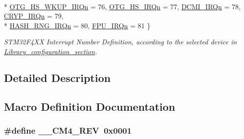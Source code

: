 \begin{DoxyCompactItemize}
\\*
\hyperlink{group___configuration__section__for___c_m_s_i_s_gga666eb0caeb12ec0e281415592ae89083a9e5c9d81dd3985a88094f8158c0f0267}{O\-T\-G\-\_\-\-H\-S\-\_\-\-W\-K\-U\-P\-\_\-\-I\-R\-Qn} = 76, 
\hyperlink{group___configuration__section__for___c_m_s_i_s_gga666eb0caeb12ec0e281415592ae89083aad2d5e47d27fe3a02f7059b20bb729c0}{O\-T\-G\-\_\-\-H\-S\-\_\-\-I\-R\-Qn} = 77, 
\hyperlink{group___configuration__section__for___c_m_s_i_s_gga666eb0caeb12ec0e281415592ae89083ace3c0fc2c4d05a7c02e3c987da5bc8e8}{D\-C\-M\-I\-\_\-\-I\-R\-Qn} = 78, 
\hyperlink{group___configuration__section__for___c_m_s_i_s_gga666eb0caeb12ec0e281415592ae89083a70c9645bf48ca539510cc8f7d974f017}{C\-R\-Y\-P\-\_\-\-I\-R\-Qn} = 79, 
\\*
\hyperlink{group___configuration__section__for___c_m_s_i_s_gga666eb0caeb12ec0e281415592ae89083a86a161642b54055f9bbea3937e6352de}{H\-A\-S\-H\-\_\-\-R\-N\-G\-\_\-\-I\-R\-Qn} = 80, 
\hyperlink{group___configuration__section__for___c_m_s_i_s_gga666eb0caeb12ec0e281415592ae89083aa6b8ff01b016a798c6e639728c179e4f}{F\-P\-U\-\_\-\-I\-R\-Qn} = 81
 \}
\begin{DoxyCompactList}\small\item\em S\-T\-M32\-F4\-X\-X Interrupt Number Definition, according to the selected device in \hyperlink{group___library__configuration__section}{Library\-\_\-configuration\-\_\-section}. \end{DoxyCompactList}\end{DoxyCompactItemize}


\subsection{Detailed Description}


\subsection{Macro Definition Documentation}
\hypertarget{group___configuration__section__for___c_m_s_i_s_ga45a97e4bb8b6ce7c334acc5f45ace3ba}{
\subsubsection[{\-\_\-\-\_\-\-C\-M4\-\_\-\-R\-E\-V}]{\setlength{\rightskip}{0pt plus 5cm}\#define \-\_\-\-\_\-\-C\-M4\-\_\-\-R\-E\-V~0x0001}}\label{group___configuration__section__for___c_m_s_i_s_ga45a97e4bb8b6ce7c334acc5f45ace3ba}


